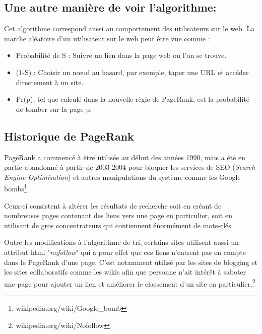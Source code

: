 \subsection*{ Une autre manière de voir l'algorithme:}
    Cet algorithme correspond aussi au comportement des utilisateurs sur le web. La marche aléatoire d'un utilisateur sur le web peut être vue comme : 
	\begin{itemize}
        \item Probabilité de S : Suivre un lien dans la page web ou l'on se trouve.
        \item (1-S) : Choisir un n\oe ud au hasard, par exemple, taper une URL et accéder directement à un site.
        \item Pr(p), tel que calculé dans la nouvelle règle de PageRank, est la probabilité de tomber sur la page p.
	\end{itemize}
	
\subsection*{Historique de PageRank}

	PageRank a commencé à être utilisée au début des années 1990, mais a été en partie abandonné à partir de 2003-2004 pour bloquer les services de SEO (\textit{Search Engine Optimisation}) et autres manipulations du système comme les Google bombs\footnote{wikipedia.org/wiki/Google\_bomb}.
	
	Ceux-ci consistent à altérer les résultats de recherche soit en créant de nombreuses pages contenant des liens vers une page en particulier, soit en utilisant de gros concentrateurs qui contiennent énormément de mots-clés.
	
	Outre les modifications à l'algorithme de tri, certains sites utilisent aussi un attribut html "\textit{nofollow}" qui a pour effet que ces liens n'entrent pas en compte dans le PageRank d'une page. C'est notamment utilisé par les sites de blogging et les sites collaboratifs comme les wikis afin que personne n'ait intérêt à saboter une page pour ajouter un lien et améliorer le classement d'un site en particulier.\footnote{wikipedia.org/wiki/Nofollow}

